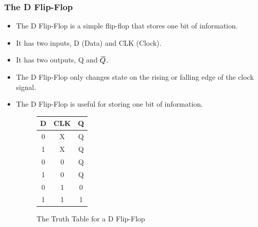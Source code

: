 \documentclass[12pt]{article}
\newcommand{\closure}[2][3]{%
	{}\mkern#1mu\overline{\mkern-#1mu#2}}
\begin{document}
\subsubsection{The D Flip-Flop}
\begin{itemize}
	\item The D Flip-Flop is a simple flip-flop that stores one bit of
	      information.
	\item It has two inputs, D (Data) and CLK (Clock).
	\item It has two outputs, Q and \(\closure{Q}\).
	\item The D Flip-Flop only changes state on the rising or falling edge
	      of the clock signal.
	\item The D Flip-Flop is useful for storing one bit of information.
	      \begin{figure}[H]
		      \centering
		      \begin{tabular}{|c|c|c|}
			      \hline
			      D & CLK & Q \\
			      \hline
			      0 & X   & Q \\
			      1 & X   & Q \\
			      0 & 0   & Q \\
			      1 & 0   & Q \\
			      0 & 1   & 0 \\
			      1 & 1   & 1 \\
			      \hline
		      \end{tabular}
		      \caption{The Truth Table for a D Flip-Flop}
	      \end{figure}
\end{itemize}
\end{document}
